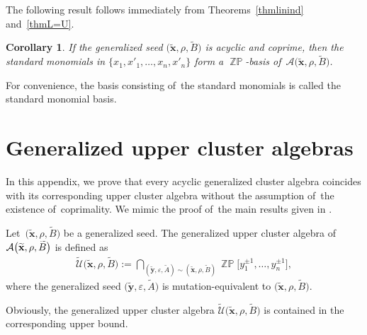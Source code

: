 \documentclass[10pt,a4paper]{amsart}
\numberwithin{equation}{section}
\newtheorem{Corollary}[Theorem]{Corollary}
\begin{document}
The following result follows immediately from Theorems~\ref{thmlinind} and~\ref{thmL=U}.
\begin{Corollary}
If the generalized seed $\big(\widetilde{\mathbf{x}},\rho,\widetilde{B}\big)$ is acyclic and coprime, then the standard monomials in $\{x_1,x'_1,\ldots,x_n,x'_n\}$ form a $\mathop{\mathbb{ZP}}$-basis of~$\mathcal{A}\big(\widetilde{\mathbf{x}},\rho,\widetilde{B}\big)$.
\end{Corollary}

For convenience, the basis consisting of~the standard monomials is called the standard monomial basis.


\appendix

\section{Generalized upper cluster algebras}\label{appendix}

In this appendix, we prove that every acyclic generalized cluster algebra coincides with its corresponding upper cluster algebra without the assumption of~the existence of~coprimality. We mimic the proof of~the main results given in \cite{muller14}.

\begin{Definition}
Let~$\big(\widetilde{\mathbf{x}},\rho,\widetilde{B}\big)$ be a generalized seed. The generalized upper cluster algebra of~$\mathcal{A}\smash{\big(\widetilde{\mathbf{x}},\rho,\widetilde{B}\big)}$ is defined as
\begin{gather*}
\widetilde{\mathcal{U}}\big(\widetilde{\mathbf{x}},\rho,\widetilde{B}\big):= \bigcap\limits_{\left(\widetilde{\mathbf{y}},\varepsilon,\widetilde{A}\right)\sim \left(\widetilde{\mathbf{x}},\rho,\widetilde{B}\right)} \mathop{\mathbb{ZP}}\!\big[y^{\pm1}_1,\ldots,y^{\pm1}_n\big],
\end{gather*}
where the generalized seed $\big(\widetilde{\mathbf{y}},\varepsilon,\widetilde{A}\big)$ is mutation-equivalent to $\big(\widetilde{\mathbf{x}},\rho,\widetilde{B}\big)$.

\end{Definition}
Obviously, the generalized upper cluster algebra $\widetilde{\mathcal{U}}\big(\widetilde{\mathbf{x}},\rho,\widetilde{B}\big)$ is contained in the corresponding upper bound.
\end{document}
